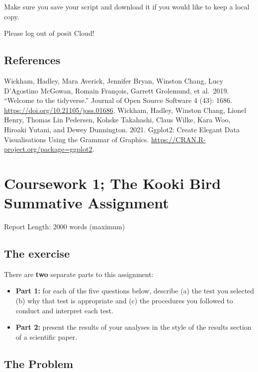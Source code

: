 \documentclass[
]{book}
\providecommand{\tightlist}{%
  \setlength{\itemsep}{0pt}\setlength{\parskip}{0pt}}
\begin{document}
Make sure you save your script and download it if you would like to keep a local copy.

Please log out of posit Cloud!

\section{References}\label{references-6}

Wickham, Hadley, Mara Averick, Jennifer Bryan, Winston Chang, Lucy D'Agostino McGowan, Romain François, Garrett Grolemund, et al.~2019. ``Welcome to the tidyverse.'' Journal of Open Source Software 4 (43): 1686. \url{https://doi.org/10.21105/joss.01686}.
Wickham, Hadley, Winston Chang, Lionel Henry, Thomas Lin Pedersen, Kohske Takahashi, Claus Wilke, Kara Woo, Hiroaki Yutani, and Dewey Dunnington. 2021. Ggplot2: Create Elegant Data Visualisations Using the Grammar of Graphics. \url{https://CRAN.R-project.org/package=ggplot2}.

\chapter{Coursework 1; The Kooki Bird Summative Assignment}\label{coursework-1-the-kooki-bird-summative-assignment}

Report Length: 2000 words (maximum)

\section{The exercise}\label{the-exercise}

There are \textbf{two} separate parts to this assignment:

\begin{itemize}
\tightlist
\item
  \textbf{Part 1:} for each of the five questions below, describe (a) the test you selected (b) why that test is appropriate and (c) the procedures you followed to conduct and interpret each test.
\item
  \textbf{Part 2:} present the results of your analyses in the style of the results section of a scientific paper.
\end{itemize}

\section{The Problem}\label{the-problem}
\end{document}
